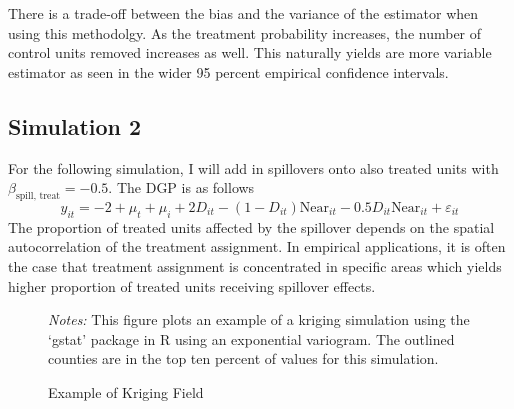 \documentclass[11pt]{article}
\begin{document}
There is a trade-off between the bias and the variance of the estimator when using this methodolgy. As the treatment probability increases, the number of control units removed increases as well. This naturally yields are more variable estimator as seen in the wider 95 percent empirical confidence intervals. 


\subsection{Simulation 2}

For the following simulation, I will add in spillovers onto also treated units with $\beta_{\text{spill, treat}} = -0.5$. The DGP is as follows 
\begin{equation}
    \label{dgp2} 
    y_{it} = -2 + \mu_t + \mu_i + 2 D_{it} - (1-D_{it}) \text{Near}_{it} - 0.5 D_{it} \text{Near}_{it} + \varepsilon_{it}   
\end{equation} 
The proportion of treated units affected by the spillover depends on the spatial autocorrelation of the treatment assignment. In empirical applications, it is often the case that treatment assignment is concentrated in specific areas which yields higher proportion of treated units receiving spillover effects.

\begin{figure}[t]
    \caption{Example of Kriging Field}
    \label{fig:kriging}
    {\centering
    }
    {\footnotesize
        \textit{Notes:} This figure plots an example of a kriging simulation using the `gstat' package in R using an exponential variogram. The outlined counties are in the top ten percent of values for this simulation. 
    }
\end{figure}
\end{document}
